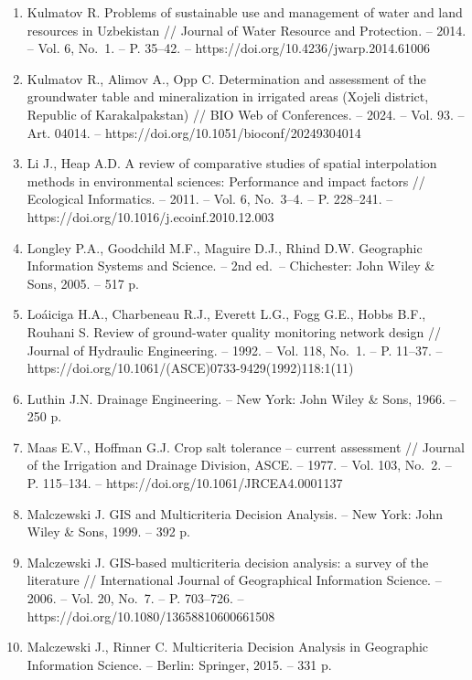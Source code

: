 \begin{enumerate}
  problems on the Witwatersrand // Journal of the Chemical,
  Metallurgical and Mining Society of South Africa. -- 1951. -- Vol. 52,
  No.~6. -- P. 119--139.
\item
  Kulmatov R. Problems of sustainable use and management of water and
  land resources in Uzbekistan // Journal of Water Resource and
  Protection. -- 2014. -- Vol. 6, No.~1. -- P. 35--42. --
  https://doi.org/10.4236/jwarp.2014.61006
\item
  Kulmatov R., Alimov A., Opp C. Determination and assessment of the
  groundwater table and mineralization in irrigated areas (Xojeli
  district, Republic of Karakalpakstan) // BIO Web of Conferences. --
  2024. -- Vol. 93. -- Art. 04014. --
  https://doi.org/10.1051/bioconf/20249304014
\item
  Li J., Heap A.D. A review of comparative studies of spatial
  interpolation methods in environmental sciences: Performance and
  impact factors // Ecological Informatics. -- 2011. -- Vol. 6,
  No.~3--4. -- P. 228--241. --
  https://doi.org/10.1016/j.ecoinf.2010.12.003
\item
  Longley P.A., Goodchild M.F., Maguire D.J., Rhind D.W. Geographic
  Information Systems and Science. -- 2nd ed.~-- Chichester: John Wiley
  \& Sons, 2005. -- 517 p.
\item
  Loáiciga H.A., Charbeneau R.J., Everett L.G., Fogg G.E., Hobbs B.F.,
  Rouhani S. Review of ground-water quality monitoring network design //
  Journal of Hydraulic Engineering. -- 1992. -- Vol. 118, No.~1. -- P.
  11--37. -- https://doi.org/10.1061/(ASCE)0733-9429(1992)118:1(11)
\item
  Luthin J.N. Drainage Engineering. -- New York: John Wiley \& Sons,
  1966. -- 250 p.
\item
  Maas E.V., Hoffman G.J. Crop salt tolerance -- current assessment //
  Journal of the Irrigation and Drainage Division, ASCE. -- 1977. --
  Vol. 103, No.~2. -- P. 115--134. --
  https://doi.org/10.1061/JRCEA4.0001137
\item
  Malczewski J. GIS and Multicriteria Decision Analysis. -- New York:
  John Wiley \& Sons, 1999. -- 392 p.
\item
  Malczewski J. GIS-based multicriteria decision analysis: a survey of
  the literature // International Journal of Geographical Information
  Science. -- 2006. -- Vol. 20, No.~7. -- P. 703--726. --
  https://doi.org/10.1080/13658810600661508
\item
  Malczewski J., Rinner C. Multicriteria Decision Analysis in Geographic
  Information Science. -- Berlin: Springer, 2015. -- 331 p.

\end{enumerate}
